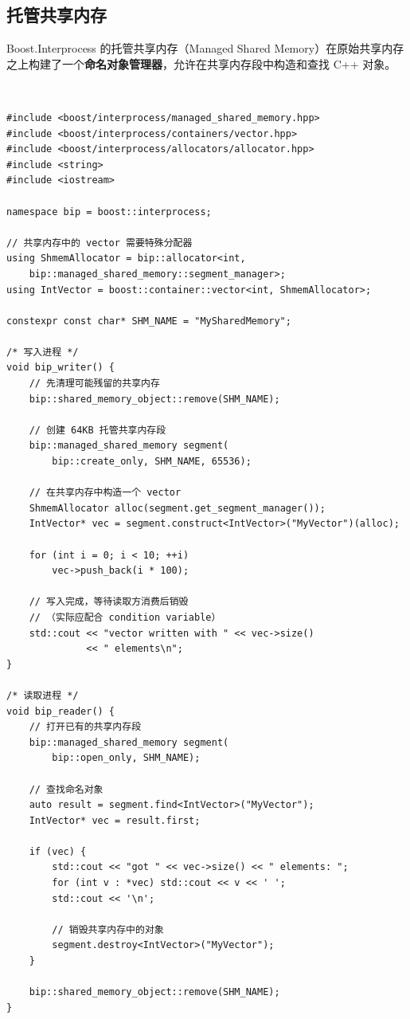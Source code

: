 \documentclass[12pt,a4paper,fontset=fandol]{ctexbook}
\newcommand{\cpplabel}{%
  \noindent\begin{tcolorbox}[sharp corners,colback=algheadbg,colframe=algheadbg,
    left=6pt,right=6pt,top=2pt,bottom=2pt,boxrule=0pt]
  \textcolor{white}{\small\bfseries\sffamily C++}\end{tcolorbox}%
}
\begin{document}
\subsection{托管共享内存}

Boost.Interprocess 的托管共享内存（Managed Shared Memory）在原始共享内存之上构建了一个\textbf{命名对象管理器}，允许在共享内存段中构造和查找 C++ 对象。

\cpplabel
\begin{lstlisting}
#include <boost/interprocess/managed_shared_memory.hpp>
#include <boost/interprocess/containers/vector.hpp>
#include <boost/interprocess/allocators/allocator.hpp>
#include <string>
#include <iostream>

namespace bip = boost::interprocess;

// 共享内存中的 vector 需要特殊分配器
using ShmemAllocator = bip::allocator<int,
    bip::managed_shared_memory::segment_manager>;
using IntVector = boost::container::vector<int, ShmemAllocator>;

constexpr const char* SHM_NAME = "MySharedMemory";

/* 写入进程 */
void bip_writer() {
    // 先清理可能残留的共享内存
    bip::shared_memory_object::remove(SHM_NAME);

    // 创建 64KB 托管共享内存段
    bip::managed_shared_memory segment(
        bip::create_only, SHM_NAME, 65536);

    // 在共享内存中构造一个 vector
    ShmemAllocator alloc(segment.get_segment_manager());
    IntVector* vec = segment.construct<IntVector>("MyVector")(alloc);

    for (int i = 0; i < 10; ++i)
        vec->push_back(i * 100);

    // 写入完成，等待读取方消费后销毁
    // （实际应配合 condition variable）
    std::cout << "vector written with " << vec->size()
              << " elements\n";
}

/* 读取进程 */
void bip_reader() {
    // 打开已有的共享内存段
    bip::managed_shared_memory segment(
        bip::open_only, SHM_NAME);

    // 查找命名对象
    auto result = segment.find<IntVector>("MyVector");
    IntVector* vec = result.first;

    if (vec) {
        std::cout << "got " << vec->size() << " elements: ";
        for (int v : *vec) std::cout << v << ' ';
        std::cout << '\n';

        // 销毁共享内存中的对象
        segment.destroy<IntVector>("MyVector");
    }

    bip::shared_memory_object::remove(SHM_NAME);
}
\end{lstlisting}
\end{document}
